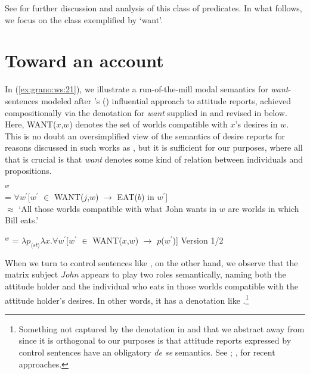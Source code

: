 \documentclass[output=paper,modfonts,nonflat]{langsci/langscibook}
\begin{document}
\noindent See \cite{GranoToappear} for further discussion and analysis of this class of predicates. In what follows, we focus on the class exemplified by `want'.



\section{Toward an account}
\label{sec:Grano:TowardAccount:4}

In  (\ref{ex:grano:ws:21}), we illustrate a run-of-the-mill modal semantics for \emph{want}-sentences modeled after \citeauthor{Hintikk1969}'s (\citeyear{Hintikk1969}) influential approach to attitude reports, achieved compositionally via the denotation for \emph{want} supplied in  and revised in  below. Here, WANT($x$,$w$) denotes the set of worlds compatible with $x$'s desires in $w$. This is no doubt an oversimplified view of the semantics of desire reports for reasons discussed in such works as \cite{Heim1992}, but it is sufficient for our purposes, where all that is crucial is that \emph{want} denotes some kind of relation between individuals and propositions.


\ea 
{}$^{w}$\\ = $\forall w^{\prime}$[$w^{\prime}$ $\in$ WANT($j$,$w$) $\rightarrow$ EAT($b$) in $w^{\prime}$]\\
$\approx$ `All those worlds compatible with what John wants in $w$ are worlds in which Bill eats.' \label{ex:grano:ws:21}
\z

\ea 
{}$^{w}$ = $\lambda p_{\langle st\rangle}\lambda x.\forall w^{\prime}$[$w^{\prime}$ $\in$ WANT($x$,$w$) $\rightarrow$ $p$($w^{\prime}$)] \hfill Version 1/2 \label{ex:grano:w:22}
\z

When we turn to control sentences like , on the other hand, we observe that the matrix subject \emph{John} appears to play two roles semantically, naming both the attitude holder and the individual who eats in those worlds compatible with the attitude holder's desires. In other words, it has a denotation like .\footnote{Something not captured by the denotation in  and that we abstract away from since it is orthogonal to our purposes is that attitude reports expressed by control sentences have an obligatory \emph{de se} semantics. See ; , \citeyear{Pearson2016} for recent approaches.}
\end{document}
